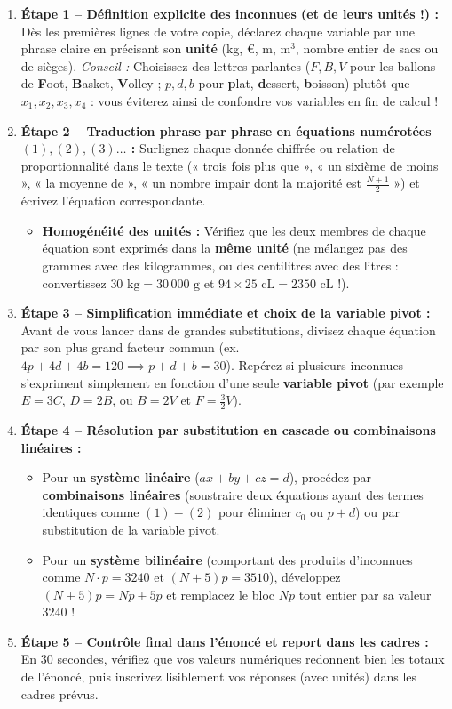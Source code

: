 \begin{theoreme}
\begin{enumerate}
    \item \textbf{Étape 1 -- Définition explicite des inconnues (et de leurs unités !) :}
    Dès les premières lignes de votre copie, déclarez chaque variable par une phrase claire en précisant son \textbf{unité} (kg, €, m, $\text{m}^3$, nombre entier de sacs ou de sièges).
    \emph{Conseil :} Choisissez des lettres parlantes ($F, B, V$ pour les ballons de \textbf{F}oot, \textbf{B}asket, \textbf{V}olley ; $p, d, b$ pour \textbf{p}lat, \textbf{d}essert, \textbf{b}oisson) plutôt que $x_1, x_2, x_3, x_4$ : vous éviterez ainsi de confondre vos variables en fin de calcul !
    \item \textbf{Étape 2 -- Traduction phrase par phrase en équations numérotées $(1), (2), (3)\dots$ :}
    Surlignez chaque donnée chiffrée ou relation de proportionnalité dans le texte (« trois fois plus que », « un sixième de moins », « la moyenne de », « un nombre impair dont la majorité est $\frac{N+1}{2}$ ») et écrivez l'équation correspondante.
    \begin{itemize}
        \item \textbf{Homogénéité des unités :} Vérifiez que les deux membres de chaque équation sont exprimés dans la \textbf{même unité} (ne mélangez pas des grammes avec des kilogrammes, ou des centilitres avec des litres : convertissez $30\text{ kg} = 30\,000\text{ g}$ et $94 \times 25\text{ cL} = 2350\text{ cL}$ !).
    \end{itemize}
    \item \textbf{Étape 3 -- Simplification immédiate et choix de la variable pivot :}
    Avant de vous lancer dans de grandes substitutions, divisez chaque équation par son plus grand facteur commun (ex. $4p + 4d + 4b = 120 \implies p + d + b = 30$). Repérez si plusieurs inconnues s'expriment simplement en fonction d'une seule \textbf{variable pivot} (par exemple $E = 3C$, $D = 2B$, ou $B = 2V$ et $F = \frac{3}{2}V$).
    \item \textbf{Étape 4 -- Résolution par substitution en cascade ou combinaisons linéaires :}
    \begin{itemize}
        \item Pour un \textbf{système linéaire} ($ax + by + cz = d$), procédez par \textbf{combinaisons linéaires} (soustraire deux équations ayant des termes identiques comme $(1) - (2)$ pour éliminer $c_0$ ou $p + d$) ou par substitution de la variable pivot.
        \item Pour un \textbf{système bilinéaire} (comportant des produits d'inconnues comme $N \cdot p = 3240$ et $(N + 5)p = 3510$), développez $(N + 5)p = Np + 5p$ et remplacez le bloc $Np$ tout entier par sa valeur $3240$ !
    \end{itemize}
    \item \textbf{Étape 5 -- Contrôle final dans l'énoncé et report dans les cadres :}
    En 30 secondes, vérifiez que vos valeurs numériques redonnent bien les totaux de l'énoncé, puis inscrivez lisiblement vos réponses (avec unités) dans les cadres prévus.
\end{enumerate}
\end{theoreme}

